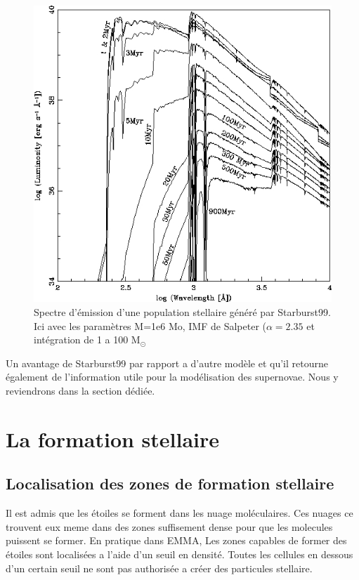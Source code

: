 \begin{figure}[htbp]
        \includegraphics[width=.95\linewidth]{img/03/spectre_starburst.jpg} 
        \caption{Spectre d'émission d'une population stellaire généré par Starburst99.
        Ici avec les paramètres M=1e6 Mo, IMF de Salpeter ($\alpha=2.35$ et intégration de 1 a 100 M$_\odot$ }
 		\label{fig:spectre_starburst}
\end{figure}

Un avantage de Starburst99 par rapport a d'autre modèle et qu'il retourne également de l'information utile pour la modélisation des supernovae.
Nous y reviendrons dans la section dédiée. %


\section{La formation stellaire}

\subsection{Localisation des zones de formation stellaire}

Il est admis que les étoiles se forment dans les nuage moléculaires.
Ces nuages ce trouvent eux meme dans des zones suffisement dense pour que les molecules puissent se former.
En pratique dans EMMA, 
Les zones capables de former des étoiles sont localisées a l'aide d'un seuil en densité.
Toutes les cellules en dessous d'un certain seuil ne sont pas authorisée a créer des particules stellaire.

